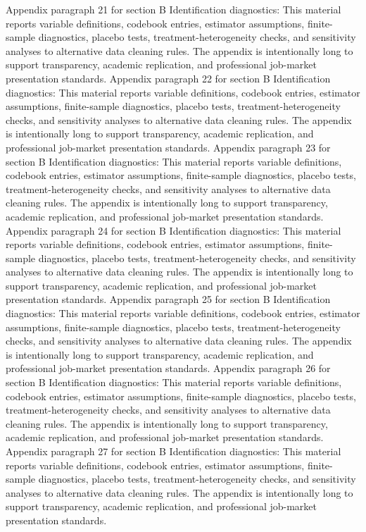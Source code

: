\documentclass[preprint,12pt]{elsarticle}
\begin{document}
Appendix paragraph 21 for section B Identification diagnostics: This material reports variable definitions, codebook entries, estimator assumptions, finite-sample diagnostics, placebo tests, treatment-heterogeneity checks, and sensitivity analyses to alternative data cleaning rules. The appendix is intentionally long to support transparency, academic replication, and professional job-market presentation standards.
Appendix paragraph 22 for section B Identification diagnostics: This material reports variable definitions, codebook entries, estimator assumptions, finite-sample diagnostics, placebo tests, treatment-heterogeneity checks, and sensitivity analyses to alternative data cleaning rules. The appendix is intentionally long to support transparency, academic replication, and professional job-market presentation standards.
Appendix paragraph 23 for section B Identification diagnostics: This material reports variable definitions, codebook entries, estimator assumptions, finite-sample diagnostics, placebo tests, treatment-heterogeneity checks, and sensitivity analyses to alternative data cleaning rules. The appendix is intentionally long to support transparency, academic replication, and professional job-market presentation standards.
Appendix paragraph 24 for section B Identification diagnostics: This material reports variable definitions, codebook entries, estimator assumptions, finite-sample diagnostics, placebo tests, treatment-heterogeneity checks, and sensitivity analyses to alternative data cleaning rules. The appendix is intentionally long to support transparency, academic replication, and professional job-market presentation standards.
Appendix paragraph 25 for section B Identification diagnostics: This material reports variable definitions, codebook entries, estimator assumptions, finite-sample diagnostics, placebo tests, treatment-heterogeneity checks, and sensitivity analyses to alternative data cleaning rules. The appendix is intentionally long to support transparency, academic replication, and professional job-market presentation standards.
Appendix paragraph 26 for section B Identification diagnostics: This material reports variable definitions, codebook entries, estimator assumptions, finite-sample diagnostics, placebo tests, treatment-heterogeneity checks, and sensitivity analyses to alternative data cleaning rules. The appendix is intentionally long to support transparency, academic replication, and professional job-market presentation standards.
Appendix paragraph 27 for section B Identification diagnostics: This material reports variable definitions, codebook entries, estimator assumptions, finite-sample diagnostics, placebo tests, treatment-heterogeneity checks, and sensitivity analyses to alternative data cleaning rules. The appendix is intentionally long to support transparency, academic replication, and professional job-market presentation standards.
\end{document}

